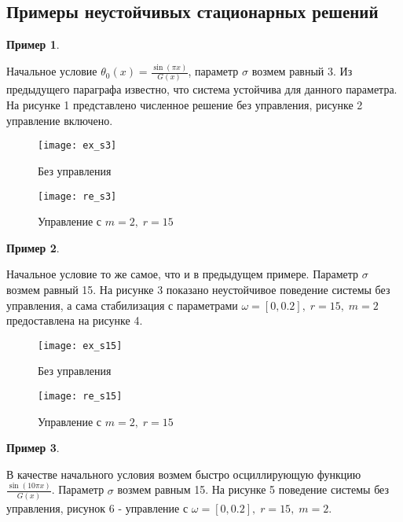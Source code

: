 \subsection{Примеры неустойчивых стационарных решений}

\newtheorem{exmp_bur}{Пример}
\begin{exmp_bur}
\end{exmp_bur}

Начальное условие $\theta_0(x) = \frac{\sin(\pi x)}{G(x)}$, параметр $\sigma$ возмем равный 3. Из предыдущего параграфа известно, что система устойчива для данного параметра. На рисунке 1 представлено численное решение без управления, рисунке 2 управление включено.

\begin{figure}[H]
\centering
\begin{minipage}{.5\textwidth}
  \centering
  \texttt{[image: ex\_s3]}
  \caption{Без управления}
  \label{fig:test1}
\end{minipage}%
\begin{minipage}{.5\textwidth}
  \centering
  \texttt{[image: re\_s3]}
  \caption{Управление с $m = 2, \; r = 15$}
  \label{fig:test2}
\end{minipage}
\end{figure}


\begin{exmp_bur}
\end{exmp_bur}
Начальное условие то же самое, что и в предыдущем примере. Параметр $\sigma$ возмем равный 15. На рисунке 3 показано неустойчивое поведение системы без управления, а сама стабилизация с параметрами $\omega = [0, 0.2], \; r = 15, \; m = 2$ предоставлена на рисунке 4.


\begin{figure}[H]
\centering
\begin{minipage}{.5\textwidth}
  \centering
  \texttt{[image: ex\_s15]}
  \caption{Без управления}
  \label{fig:test1}
\end{minipage}%
\begin{minipage}{.5\textwidth}
  \centering
  \texttt{[image: re\_s15]}
  \caption{Управление с $m = 2, \; r = 15$}
  \label{fig:test2}
\end{minipage}
\end{figure}


\begin{exmp_bur}
\end{exmp_bur}
В качестве начального условия возмем быстро осциллирующую функцию $\frac{\sin(10 \pi x)}{G(x)}$. Параметр $\sigma$ возмем равным 15. На рисунке 5 поведение системы без управления, рисунок 6 - управление с $\omega = [0, 0.2], \; r = 15, \; m = 2$.

